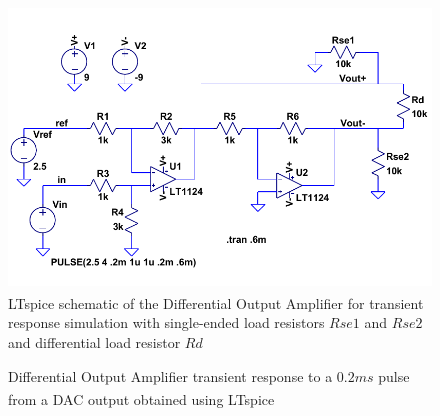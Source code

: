 \begin{figure}[H]
	\begin{singlespace}
	\centering 
		\includegraphics{./figures/LTSchemTrans} 
	\caption{LTspice\textsuperscript{\textregistered} schematic of the Differential Output Amplifier for transient response simulation with single-ended load resistors $Rse1$ and $Rse2$ and differential load resistor $Rd$\label{fig:DiffAmpTransSchem}}
	\end{singlespace}
\end{figure}

\begin{figure}[H]
	\begin{singlespace}
	\centering 
		\resizebox{\textwidth-0.5in}{!}{}
	\caption{Differential Output Amplifier transient response to a $0.2\unit{ms}$ pulse from a DAC output obtained using LTspice\textsuperscript{\textregistered}\label{fig:DiffAmpTransSim}}
	\end{singlespace}
\end{figure}
